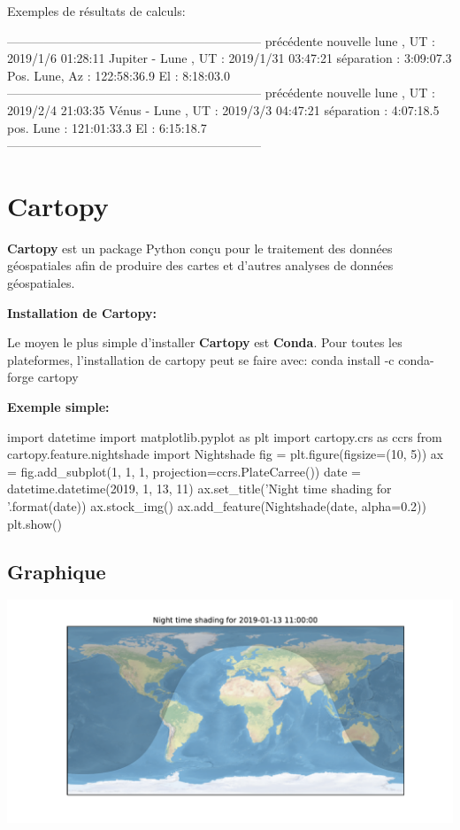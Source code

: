 \documentclass[%
oneside,                 %
final,                   %
10pt]{article}
\begin{document}
Exemples de résultats de calculs:

\bccq
--------------------------------------------------------------
précédente nouvelle lune , UT : 2019/1/6 01:28:11
Jupiter - Lune , UT : 2019/1/31 03:47:21 séparation : 3:09:07.3
Pos. Lune, Az : 122:58:36.9 El : 8:18:03.0
--------------------------------------------------------------
précédente nouvelle lune , UT : 2019/2/4 21:03:35
Vénus - Lune , UT : 2019/3/3 04:47:21 séparation : 4:07:18.5
pos. Lune : 121:01:33.3 El : 6:15:18.7
--------------------------------------------------------------
\eccq
\section{Cartopy}
\textbf{Cartopy} est un package Python conçu pour le traitement des données géospatiales afin de produire des cartes et d’autres analyses de données géospatiales.

\textbf{Installation de Cartopy:}

Le moyen le plus simple d’installer \textbf{Cartopy} est \textbf{Conda}. Pour toutes les plateformes, l’installation de cartopy peut se faire avec:
\bshell
conda install -c conda-forge cartopy
\eshell

\textbf{Exemple simple:}

\bpycod
import datetime
import matplotlib.pyplot as plt
import cartopy.crs as ccrs
from cartopy.feature.nightshade import Nightshade
fig = plt.figure(figsize=(10, 5))
ax = fig.add_subplot(1, 1, 1, projection=ccrs.PlateCarree())
date = datetime.datetime(2019, 1, 13, 11)
ax.set_title('Night time shading for {}'.format(date))
ax.stock_img()
ax.add_feature(Nightshade(date, alpha=0.2))
plt.show()
\epycod

\subsection{Graphique}


\vspace{6mm}

\centerline{\includegraphics[width=1.2\linewidth]{figs/cartopy1.pdf}}
\end{document}
